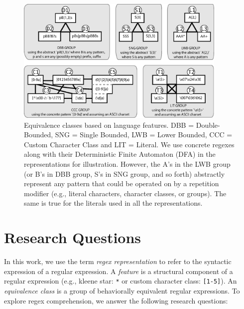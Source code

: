 \begin{figure}[tb]
\centering
\includegraphics[width=0.90\textwidth]{illustrations/refactoringTree.eps}
\vspace{-6pt}
\caption{Equivalence classes based on language features. DBB = Double-Bounded, SNG = Single Bounded, LWB = Lower Bounded, CCC = Custom Character Class and LIT = Literal. We use concrete regexes along with their Deterministic Finite Automaton (DFA) in the representations for illustration. However, the A's in the LWB group (or B's in DBB group, S's in SNG group, and so forth) abstractly represent any pattern that could be operated on by a repetition modifier (e.g., literal characters, character classes, or groups). The same is true for the literals used in all the representations. }
\vspace{-6pt}
\label{fig:refactoringTree}
\end{figure}


\section{Research Questions}
\label{sec:study}

In this work, we use the term {\em regex representation} to refer to the syntactic expression of a regular expression. A \emph{feature} is a structural component of a regular expression  (e.g., kleene star: \verb!*! or custom character class: \verb![1-5]!). An \emph{equivalence class} is a group of behaviorally equivalent regular expressions. 
To explore regex comprehension, we answer the following  research questions: \\


